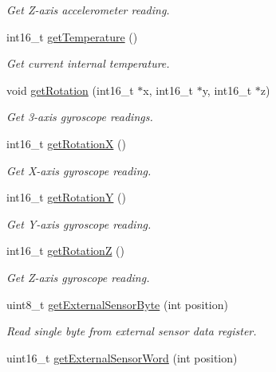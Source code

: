 \begin{DoxyCompactItemize}
\begin{DoxyCompactList}\small\item\em Get Z-\/axis accelerometer reading. \end{DoxyCompactList}\item 
int16\+\_\+t \mbox{\hyperlink{classMPU6050_aedfa4f1e6507f48c0a09545345a87875}{get\+Temperature}} ()
\begin{DoxyCompactList}\small\item\em Get current internal temperature. \end{DoxyCompactList}\item 
void \mbox{\hyperlink{classMPU6050_a8ca85b87e7e0230921062fce7889b0d1}{get\+Rotation}} (int16\+\_\+t $\ast$x, int16\+\_\+t $\ast$y, int16\+\_\+t $\ast$z)
\begin{DoxyCompactList}\small\item\em Get 3-\/axis gyroscope readings. \end{DoxyCompactList}\item 
int16\+\_\+t \mbox{\hyperlink{classMPU6050_a268f52843a24992ff06a3f12392de584}{get\+RotationX}} ()
\begin{DoxyCompactList}\small\item\em Get X-\/axis gyroscope reading. \end{DoxyCompactList}\item 
int16\+\_\+t \mbox{\hyperlink{classMPU6050_a97cbe7f10dd27e07bd78d1c25e4286b5}{get\+RotationY}} ()
\begin{DoxyCompactList}\small\item\em Get Y-\/axis gyroscope reading. \end{DoxyCompactList}\item 
int16\+\_\+t \mbox{\hyperlink{classMPU6050_ae0fee1ba996a2b6f914df6fc34e7da48}{get\+RotationZ}} ()
\begin{DoxyCompactList}\small\item\em Get Z-\/axis gyroscope reading. \end{DoxyCompactList}\item 
uint8\+\_\+t \mbox{\hyperlink{classMPU6050_a7f786ab4264f40e5a95e8937ec9adcc2}{get\+External\+Sensor\+Byte}} (int position)
\begin{DoxyCompactList}\small\item\em Read single byte from external sensor data register. \end{DoxyCompactList}\item 
uint16\+\_\+t \mbox{\hyperlink{classMPU6050_aaee15e48af7ba78660b5754f3bb5f37a}{get\+External\+Sensor\+Word}} (int position)

\end{DoxyCompactItemize}
